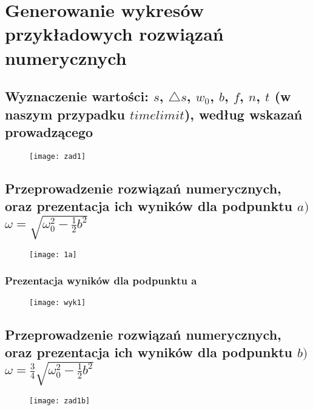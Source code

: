 \documentclass[polish,polish,a4paper]{article}
\begin{document}
		\section{Generowanie wykresów przykładowych rozwiązań numerycznych}
		\subsection{Wyznaczenie wartości: $s$, $\triangle s$, $w_{0}$, $b$, $f$, $n$, $t$ (w naszym przypadku $timelimit$),  według wskazań prowadzącego}
		
		\begin{figure}[H]
			\centering
			\texttt{[image: zad1]}
		\end{figure}

		\subsection{Przeprowadzenie rozwiązań numerycznych, oraz prezentacja ich wyników dla podpunktu $ a) $ $\omega = \sqrt{\omega_{0}^2 - \frac{1}{2}b^2}$}
		
				\begin{figure}[H]
			\centering
			\texttt{[image: 1a]}
		\end{figure}
	
		\subsubsection*{Prezentacja wyników dla podpunktu a}
		
						\begin{figure}[H]
			\centering
			\texttt{[image: wyk1]}
		\end{figure}
		
		\subsection{Przeprowadzenie rozwiązań numerycznych, oraz prezentacja ich wyników dla podpunktu $ b) $ $\omega = \frac{3}{4}\sqrt{\omega_{0}^2 - \frac{1}{2}b^2}$}
		
				\begin{figure}[H]
	\centering
	\texttt{[image: zad1b]}
\end{figure}
		
\end{document}
